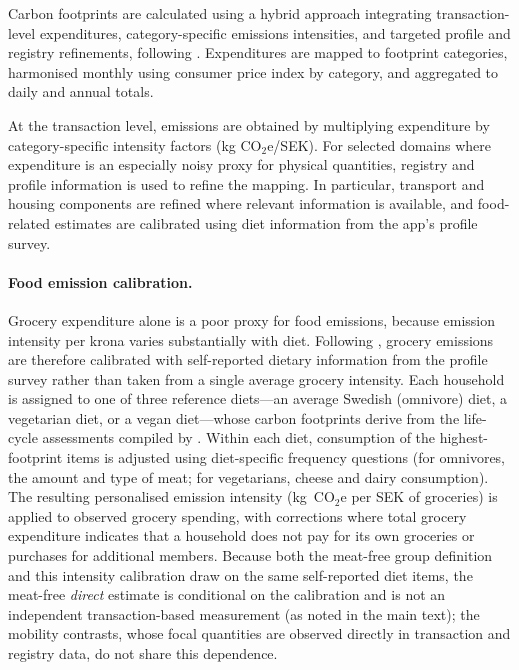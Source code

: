 \documentclass[12pt]{article}
\begin{document}
Carbon footprints are calculated using a hybrid approach integrating transaction-level expenditures, category-specific emissions intensities, and targeted profile and registry refinements, following \citet{andersson2020novel}. Expenditures are mapped to footprint categories, harmonised monthly using consumer price index by category, and aggregated to daily and annual totals.

At the transaction level, emissions are obtained by multiplying expenditure by category-specific intensity factors (kg CO$_2$e/SEK). For selected domains where expenditure is an especially noisy proxy for physical quantities, registry and profile information is used to refine the mapping. In particular, transport and housing components are refined where relevant information is available, and food-related estimates are calibrated using diet information from the app's profile survey.

\paragraph{Food emission calibration.}
Grocery expenditure alone is a poor proxy for food emissions, because emission intensity per krona varies substantially with diet. Following \citet{andersson2020novel}, grocery emissions are therefore calibrated with self-reported dietary information from the profile survey rather than taken from a single average grocery intensity. Each household is assigned to one of three reference diets---an average Swedish (omnivore) diet, a vegetarian diet, or a vegan diet---whose carbon footprints derive from the life-cycle assessments compiled by \citet{bryngelsson2016}. Within each diet, consumption of the highest-footprint items is adjusted using diet-specific frequency questions (for omnivores, the amount and type of meat; for vegetarians, cheese and dairy consumption). The resulting personalised emission intensity (kg~CO$_2$e per SEK of groceries) is applied to observed grocery spending, with corrections where total grocery expenditure indicates that a household does not pay for its own groceries or purchases for additional members. Because both the meat-free group definition and this intensity calibration draw on the same self-reported diet items, the meat-free \emph{direct} estimate is conditional on the calibration and is not an independent transaction-based measurement (as noted in the main text); the mobility contrasts, whose focal quantities are observed directly in transaction and registry data, do not share this dependence.
\end{document}
